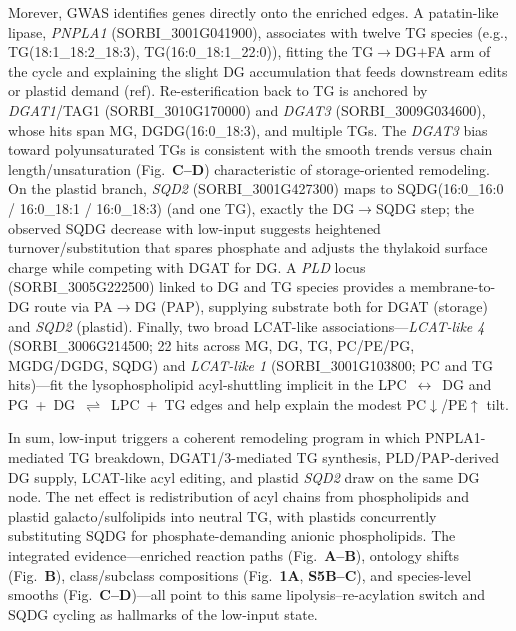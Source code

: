 \documentclass[10pt,letterpaper]{article}
\begin{document}
\begin{itemize}
Morever, GWAS identifies genes directly onto the enriched edges. A patatin-like lipase, \textit{PNPLA1} (SORBI\_3001G041900), associates with twelve TG species (e.g., TG(18{:}1\_18{:}2\_18{:}3), TG(16{:}0\_18{:}1\_22{:}0)), fitting the TG$\rightarrow$DG$+$FA arm of the cycle and explaining the slight DG accumulation that feeds downstream edits or plastid demand (ref). Re-esterification back to TG is anchored by \textit{DGAT1}/TAG1 (SORBI\_3010G170000) and \textit{DGAT3} (SORBI\_3009G034600), whose hits span MG, DGDG(16{:}0\_18{:}3), and multiple TGs. The \textit{DGAT3} bias toward polyunsaturated TGs is consistent with the smooth trends versus chain length/unsaturation (Fig.\ \textbf{C–D}) characteristic of storage-oriented remodeling. On the plastid branch, \textit{SQD2} (SORBI\_3001G427300) maps to SQDG(16{:}0\_16{:}0 / 16{:}0\_18{:}1 / 16{:}0\_18{:}3) (and one TG), exactly the DG$\rightarrow$SQDG step; the observed SQDG decrease with low-input suggests heightened turnover/substitution that spares phosphate and adjusts the thylakoid surface charge while competing with DGAT for DG. A \textit{PLD} locus (SORBI\_3005G222500) linked to DG and TG species provides a membrane-to-DG route via PA$\rightarrow$DG (PAP), supplying substrate both for DGAT (storage) and \textit{SQD2} (plastid). Finally, two broad LCAT-like associations—\textit{LCAT-like 4} (SORBI\_3006G214500; 22 hits across MG, DG, TG, PC/PE/PG, MGDG/DGDG, SQDG) and \textit{LCAT-like 1} (SORBI\_3001G103800; PC and TG hits)—fit the lysophospholipid acyl-shuttling implicit in the \mbox{LPC $\leftrightarrow$ DG} and \mbox{PG + DG $\rightleftharpoons$ LPC + TG} edges and help explain the modest PC$\downarrow$/PE$\uparrow$ tilt.

In sum, low-input triggers a coherent remodeling program in which PNPLA1-mediated TG breakdown, DGAT1/3-mediated TG synthesis, PLD/PAP-derived DG supply, LCAT-like acyl editing, and plastid \textit{SQD2} draw on the same DG node. The net effect is redistribution of acyl chains from phospholipids and plastid galacto/sulfolipids into neutral TG, with plastids concurrently substituting SQDG for phosphate-demanding anionic phospholipids. The integrated evidence—enriched reaction paths (Fig.\ \textbf{A–B}), ontology shifts (Fig.\ \textbf{B}), class/subclass compositions (Fig.\ \textbf{1A}, \textbf{S5B–C}), and species-level smooths (Fig.\ \textbf{C–D})—all point to this same lipolysis–re-acylation switch and SQDG cycling as hallmarks of the low-input state.



\end{itemize}
\end{document}
